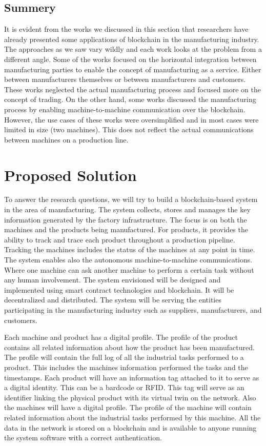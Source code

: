 \documentclass[runningheads]{llncs}
\begin{document}
\subsection{Summery}
It is evident from the works we discussed in this section that researchers have already presented some applications of blockchain in the manufacturing industry. The approaches as we saw vary wildly and each work looks at the problem from a different angle. Some of the works focused on the horizontal integration between manufacturing parties to enable the concept of manufacturing as a service. Either between manufacturers themselves or between manufacturers and customers. These works neglected the actual manufacturing process and focused more on the concept of trading. On the other hand, some works discussed the manufacturing process by enabling machine-to-machine communication over the blockchain. However, the use cases of these works were oversimplified and in most cases were limited in size (two machines). This does not reflect the actual communications between machines on a production line.


\section{Proposed Solution}
To answer the research questions, we will try to build a blockchain-based system in the area of manufacturing. The system collects, stores and manages the key information generated by the factory infrastructure. The focus is on both the machines and the products being manufactured. For products, it provides the ability to track and trace each product throughout a production pipeline. Tracking the machines includes the status of the machines at any point in time. The system enables also the autonomous machine-to-machine communications. Where one machine can ask another machine to perform a certain task without any human involvement. The system envisioned will be designed and implemented using smart contract technologies and blockchain. It will be decentralized and distributed. The system will be serving the entities participating in the manufacturing industry such as suppliers, manufacturers, and customers. 

\bigbreak 

\noindent Each machine and product has a digital profile. The profile of the product contains all related information about how the product has been manufactured. The profile will contain the full log of all the industrial tasks performed to a product. This includes the machines information performed the tasks and the timestamps. Each product will have an information tag attached to it to serve as a digital identity. This can be a bardcode or RFID. This tag will serve as an identifier linking the physical product with its virtual twin on the network. Also the machines will have a digital profile. The profile of the machine will contain related information about the industrial tasks performed by this machine. All the data in the network is stored on a blockchain and is available to anyone running the system software with a correct authentication.
\end{document}
